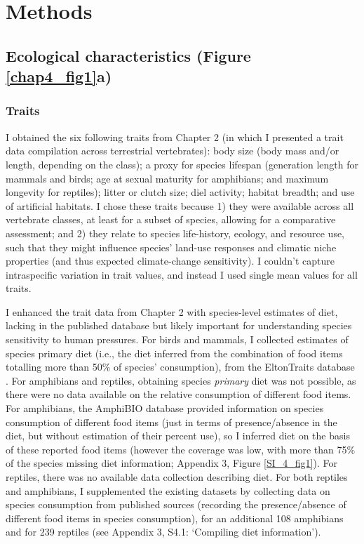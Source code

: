 \clearpage

\section{Methods}

\subsection{Ecological characteristics (Figure \ref{chap4_fig1}a)}

\subsubsection{Traits}

I obtained the six following traits from Chapter 2 (in which I presented a trait data compilation across terrestrial vertebrates): body size (body mass and/or length, depending on the class); a proxy for species lifespan (generation length for mammals and birds; age at sexual maturity for amphibians; and maximum longevity for reptiles); litter or clutch size; diel activity; habitat breadth; and use of artificial habitats. I chose these traits because 1) they were available across all vertebrate classes, at least for a subset of species, allowing for a comparative assessment; and 2) they relate to species life-history, ecology, and resource use, such that they might influence species' land-use responses and climatic niche properties (and thus expected climate-change sensitivity). I couldn't capture intraspecific variation in trait values, and instead I used single mean values for all traits.

I enhanced the trait data from Chapter 2 with species-level estimates of diet, lacking in the published database but likely important for understanding species sensitivity to human pressures. For birds and mammals, I collected estimates of species primary diet (i.e., the diet inferred from the combination of food items totalling more than 50\% of species’ consumption), from the EltonTraits database \citep{Wilman2014}. For amphibians and reptiles, obtaining species \textit{primary} diet was not possible, as there were no data available on the relative consumption of different food items. For amphibians, the AmphiBIO database \citep{Oliveira2017} provided information on species consumption of different food items (just in terms of presence/absence in the diet, but without estimation of their percent use), so I inferred diet on the basis of these reported food items (however the coverage was low, with more than 75\% of the species missing diet information; Appendix 3, Figure \ref{SI_4_fig1}). For reptiles, there was no available data collection describing diet. For both reptiles and amphibians, I supplemented the existing datasets by collecting data on species consumption from published sources  (recording the presence/absence of different food items in species consumption), for an additional 108 amphibians and for 239 reptiles (see Appendix 3, S4.1: `Compiling diet information'). 

